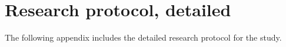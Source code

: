 \chapter{Research protocol, detailed}
\label{app:researchprotocol}
The following appendix includes the detailed research protocol for the study.
